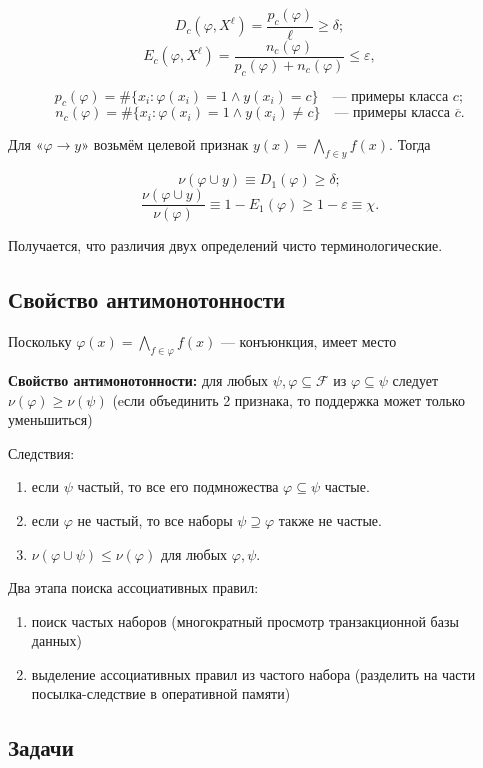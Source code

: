 \[
    D_c(\varphi, X^\ell) = \frac{p_c(\varphi)}{\ell} \geq \delta;
\]
\[
    E_c(\varphi, X^\ell) = \frac{n_c(\varphi)}{p_c(\varphi) + n_c(\varphi)} \leq \varepsilon,
\]

\[
    p_c(\varphi) = \#\{x_i : \varphi(x_i) = 1 \land y(x_i) = c\} \quad \text{— примеры класса } c;
\]
\[
    n_c(\varphi) = \#\{x_i : \varphi(x_i) = 1 \land y(x_i) \neq c\} \quad \text{— примеры класса }\overline{c}.
\]

Для «\(\varphi \rightarrow y\)» возьмём целевой признак \(y(x) = \bigwedge_{f \in y} f(x)\). Тогда

\[
    \nu(\varphi \cup y) \equiv D_1(\varphi) \geq \delta;
\]
\[
    \frac{\nu(\varphi \cup y)}{\nu(\varphi)} \equiv 1 - E_1(\varphi) \geq 1 - \varepsilon \equiv \chi.
\]

Получается, что различия двух определений чисто терминологические.
\subsection{Свойство антимонотонности}
Поскольку \(\varphi(x) = \bigwedge_{f \in \varphi} f(x)\) — конъюнкция, имеет место

\textbf{Свойство антимонотонности:}
для любых \(\psi, \varphi \subseteq \mathcal{F}\) из \(\varphi \subseteq \psi\) следует \(\nu(\varphi) \geq \nu(\psi)\) (eсли объединить 2 признака, то поддержка может только уменьшиться)

Следствия:
\begin{enumerate}
    \item если \(\psi\) частый, то все его подмножества \(\varphi \subseteq \psi\) частые.
    \item если \(\varphi\) не частый, то все наборы \(\psi \supseteq \varphi\) также не частые.
    \item \(\nu(\varphi \cup \psi) \leq \nu(\varphi)\) для любых \(\varphi, \psi\).
\end{enumerate}

Два этапа поиска ассоциативных правил:
\begin{enumerate}
    \item поиск частых наборов (многократный просмотр транзакционной базы данных)
    \item выделение ассоциативных правил из частого набора (разделить на части посылка-следствие в оперативной памяти)
\end{enumerate}

\subsection{Задачи}

